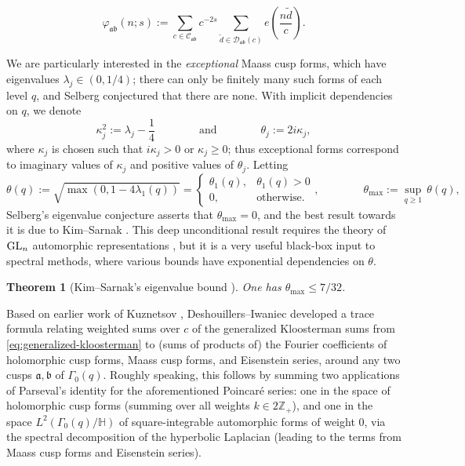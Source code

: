 \documentclass[reqno,11pt]{amsart}
\newtheorem{knowntheorem}{Theorem}
\theoremstyle{remark}
\numberwithin{equation}{section}
\newcommand{\Z}{\mathbb{Z}}
\renewcommand{\H}{\mathbb{H}}
\newcommand{\mC}{\mathcal{C}}
\newcommand{\mD}{\mathcal{D}}
\newcommand{\ma}{\mathfrak{a}}
\newcommand{\mb}{\mathfrak{b}}
\newcommand{\GL}{\textnormal{GL}}
\renewcommand{\tilde}{\widetilde}
\begin{document}
\begin{itemize}
\begin{itemize}
        \begin{equation} \label{eq:expansion-Eisenstein}
            \varphi_{\ma\mb}(n; s) := \sum_{c \in \mC_{\ma\mb}} c^{-2s} \sum_{\tilde{d} \in \mD_{\ma\mb}(c)} e\left(\frac{n
            \tilde{d}}{c}\right).
        \end{equation}
    \end{itemize}
\end{itemize}

We are particularly interested in the \emph{exceptional} Maass cusp forms, which have eigenvalues $\lambda_j \in (0, 1/4)$; there can only be finitely many such forms of each level $q$, and Selberg conjectured \cite{selberg1965estimation} that there are none. With implicit dependencies on $q$, we denote 
\begin{equation} \label{eq:eigenvalue-notation}
    \kappa_j^2 := \lambda_j - \frac{1}{4} \qquad\qquad \text{and} \qquad\qquad \theta_j := 2 i \kappa_j,
 \end{equation}
where $\kappa_j$ is chosen such that $i \kappa_j > 0$ or $\kappa_j \ge 0$; thus exceptional forms correspond to imaginary values of $\kappa_j$ and positive values of $\theta_j$. Letting
\[
    \theta(q) := \sqrt{\max\left(0, 1 - 4\lambda_1(q)\right)} = \begin{cases}
        \theta_1(q), & \theta_1(q) > 0 \\ 
        0, & \text{otherwise}.
    \end{cases},
    \qquad\qquad 
    \theta_{\max} := \sup_{q \ge 1}\, \theta(q),
\]
Selberg's eigenvalue conjecture asserts that $\theta_{\max} = 0$, and the best result towards it is due to Kim--Sarnak \cite[Appendix 2]{kim2003functoriality}. 
This deep unconditional result requires the theory of $\GL_n$ automorphic representations \cite{bump1998automorphic}, but it is a very useful black-box input to spectral methods, where various bounds have exponential dependencies on $\theta$.

\begin{knowntheorem}[Kim--Sarnak's eigenvalue bound \cite{kim2003functoriality}] \label{thm:kim-sarnak}
One has $\theta_{\max} \le 7/32$.
\end{knowntheorem}

Based on earlier work of Kuznetsov \cite{kuznetsov1980petersson}, Deshouillers--Iwaniec \cite{deshouillers1982kloosterman} developed a trace formula relating weighted sums over $c$ of the generalized Kloosterman sums from \cref{eq:generalized-kloosterman} to (sums of products of) the Fourier coefficients of holomorphic cusp forms, Maass cusp forms, and Eisenstein series, around any two cusps $\ma, \mb$ of $\Gamma_0(q)$. Roughly speaking, this follows by summing two applications of Parseval's identity for the aforementioned Poincar\'e series: one in the space of holomorphic cusp forms (summing over all weights $k \in 2\Z_+$), and one in the space $L^2(\Gamma_0(q) \slash \H)$ of square-integrable automorphic forms of weight $0$, via the spectral decomposition of the hyperbolic Laplacian (leading to the terms from Maass cusp forms and Eisenstein series). 
\end{document}
